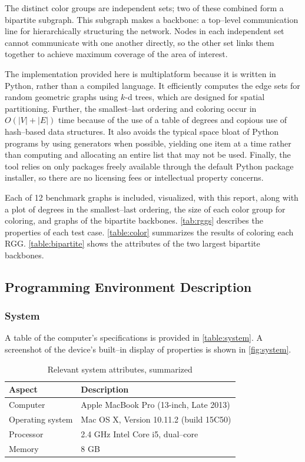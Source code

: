 \documentclass[oneside, titlepage]{scrartcl}
\begin{document}
The distinct color groups are independent sets; two of these combined form a bipartite subgraph. This subgraph makes a backbone: a top--level communication line for hierarchically structuring the network. Nodes in each independent set cannot communicate with one another directly, so the other set links them together to achieve maximum coverage of the area of interest.

The implementation provided here is multiplatform because it is written in Python, rather than a compiled language. It efficiently computes the edge sets for random geometric graphs using $k$-d trees, which are designed for spatial partitioning. Further, the smallest--last ordering and coloring occur in $O(|V| + |E|)$ time because of the use of a table of degrees and copious use of hash--based data structures. It also avoids the typical space bloat of Python programs by using generators when possible, yielding one item at a time rather than computing and allocating an entire list that may not be used. Finally, the tool relies on only packages freely available through the default Python package installer, so there are no licensing fees or intellectual property concerns. 

Each of 12 benchmark graphs is included, visualized, with this report, along with a plot of degrees in the smallest--last ordering, the size of each color group for coloring, and graphs of the bipartite backbones. \autoref{tab:rggs} describes the properties of each test case. \autoref{table:color} summarizes the results of coloring each RGG. \autoref{table:bipartite} shows the attributes of the two largest bipartite backbones.
\subsection{Programming Environment Description}
\subsubsection{System}
A table of the computer's specifications is provided in \autoref{table:system}. A screenshot of the device's built--in display of properties is shown in \autoref{fig:system}.
\begin{table}[h!]
\centering
\begin{tabular}{l | l}
\textbf{Aspect} & \textbf{Description} \\
\hline
Computer & Apple MacBook Pro (13-inch, Late 2013)\\
Operating system & Mac OS X, Version 10.11.2 (build 15C50) \\
Processor & 2.4 GHz Intel Core i5, dual--core \\
Memory & 8 GB \\
\end{tabular}
\caption{Relevant system attributes, summarized}
\label{table:system}
\end{table}
\end{document}
